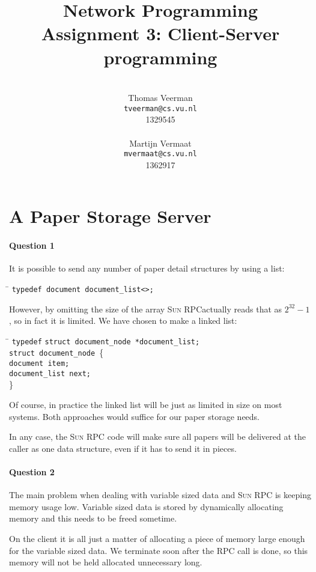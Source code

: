 \documentclass[a4paper,10pt]{article}
\title{Network Programming\\
\small{Assignment 3: Client-Server programming}}
\author{%
        \mbox{}\\
        Thomas Veerman\\
        \texttt{tveerman@cs.vu.nl}\\
        1329545\\
        \mbox{}\\
        Martijn Vermaat\\
        \texttt{mvermaat@cs.vu.nl}\\
        1362917
}
\begin{document}
\maketitle

\section{A Paper Storage Server}
\paragraph{Question 1}
It is possible to send any number of paper detail structures by using
a list:

\begin{tabbing}
\hspace{20pt}\=\kill
 \>\texttt{typedef document document\_list<>;}
\end{tabbing}

However, by omitting the size of the array \textsc{Sun RPC}actually reads that
as $2^{32} - 1$, so in fact it is limited. We have chosen to make a
linked list:

\begin{tabbing}
\hspace{20pt}\=\kill
 \> \texttt{type}\=\texttt{def} \texttt{struct document\_node *document\_list;}\\ 
 \> \texttt{struct document\_node }\{ \+ \\
 \> \texttt{document item;}\\ 
 \> \texttt{document\_list next;} \- \\
 \> \} 
\end{tabbing}

Of course, in practice the linked list will be just as limited in size
on most systems. Both approaches would suffice for our paper storage
needs.

In any case, the \textsc{Sun RPC} code will make sure all papers will be
delivered at the caller as one data structure, even if it has to send
it in pieces.

\paragraph{Question 2}
The main problem when dealing with variable sized data and \textsc{Sun RPC} is
keeping memory usage low. Variable sized data is stored by dynamically
allocating memory and this needs to be freed sometime.

On the client it is all just a matter of
allocating a piece of memory large enough for the variable sized
data. We terminate soon after the RPC call is done, so this memory
will not be held allocated unnecessary long.
\end{document}
